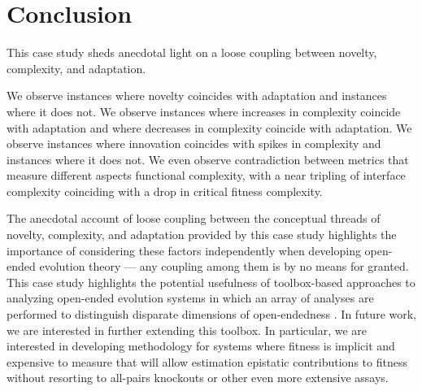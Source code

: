 \section{Conclusion}

This case study sheds anecdotal light on a loose coupling between novelty, complexity, and adaptation.

We observe instances where novelty coincides with adaptation and instances where it does not. We observe instances where increases in complexity coincide with adaptation and where decreases in complexity coincide with adaptation. We observe instances where innovation coincides with spikes in complexity and instances where it does not. We even observe contradiction between metrics that measure different aspects functional complexity, with a near tripling of interface complexity coinciding with a drop in critical fitness complexity.

The anecdotal account of loose coupling between the conceptual threads of novelty, complexity, and adaptation provided by this case study highlights the importance of considering these factors independently when developing open-ended evolution theory --- any coupling among them is by no means for granted.
This case study highlights the potential usefulness of toolbox-based approaches to analyzing open-ended evolution systems in which an array of analyses are performed to distinguish disparate dimensions of open-endedness \citep{dolson2019modes}. 
In future work, we are interested in further extending this toolbox.
In particular, we are interested in developing methodology for systems where fitness is implicit and expensive to measure that will allow estimation epistatic contributions to fitness without resorting to all-pairs knockouts or other even more extensive assays.
 








